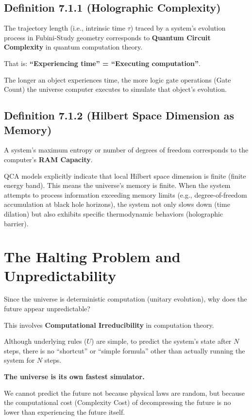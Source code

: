 \subsection{Definition 7.1.1 (Holographic Complexity)}

The trajectory length (i.e., intrinsic time $\tau$) traced by a system's evolution process in Fubini-Study geometry corresponds to \textbf{Quantum Circuit Complexity} in quantum computation theory.

That is: \textbf{``Experiencing time'' = ``Executing computation''}.

The longer an object experiences time, the more logic gate operations (Gate Count) the universe computer executes to simulate that object's evolution.

\subsection{Definition 7.1.2 (Hilbert Space Dimension as Memory)}

A system's maximum entropy or number of degrees of freedom corresponds to the computer's \textbf{RAM Capacity}.

QCA models explicitly indicate that local Hilbert space dimension is finite (finite energy band). This means the universe's memory is finite. When the system attempts to process information exceeding memory limits (e.g., degree-of-freedom accumulation at black hole horizons), the system not only slows down (time dilation) but also exhibits specific thermodynamic behaviors (holographic barrier).

\section{The Halting Problem and Unpredictability}

Since the universe is deterministic computation (unitary evolution), why does the future appear unpredictable?

This involves \textbf{Computational Irreducibility} in computation theory.

Although underlying rules ($U$) are simple, to predict the system's state after $N$ steps, there is no ``shortcut'' or ``simple formula'' other than actually running the system for $N$ steps.

\textbf{The universe is its own fastest simulator.}

We cannot predict the future not because physical laws are random, but because the computational cost (Complexity Cost) of decompressing the future is no lower than experiencing the future itself.

